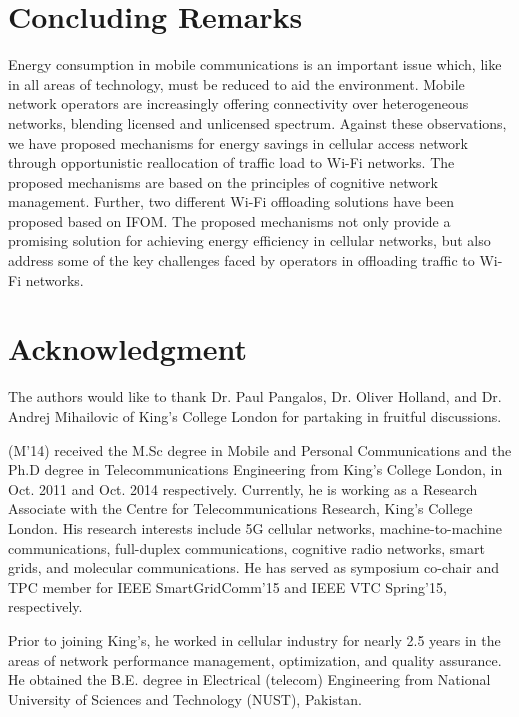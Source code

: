 \documentclass[journal]{IEEEtran}
\renewenvironment{IEEEbiography}[1]
  {\IEEEbiographynophoto{#1}}
  {\endIEEEbiographynophoto}
\begin{document}
\section{Concluding Remarks}
Energy consumption in mobile communications is an important issue which, like in all areas of technology, must be reduced to aid the environment. Mobile network operators are increasingly offering connectivity over heterogeneous networks, blending licensed and unlicensed spectrum. Against these observations, we have proposed mechanisms for energy savings in cellular access network through opportunistic reallocation of traffic load to Wi-Fi networks. The proposed mechanisms are based on the principles of cognitive network management. Further, two different Wi-Fi offloading solutions have been proposed based on IFOM. The proposed mechanisms not only provide a promising solution for achieving energy efficiency in cellular networks, but also address some of the key challenges faced by operators in offloading traffic to Wi-Fi networks. 















\section*{Acknowledgment}
The authors would like to thank Dr. Paul Pangalos, Dr. Oliver Holland, and Dr. Andrej Mihailovic of King's College London for partaking in fruitful discussions.














\begin{IEEEbiography}{Adnan Aijaz}
(M'14) received the M.Sc degree in Mobile and Personal Communications and the Ph.D degree in Telecommunications Engineering from King's College London, in Oct. 2011 and Oct. 2014 respectively. Currently, he is working as a Research Associate with the Centre for Telecommunications Research, King's College London. His research interests include 5G cellular networks, machine-to-machine communications, full-duplex communications, cognitive radio networks, smart grids, and molecular communications. He has served as  symposium co-chair and TPC member for IEEE SmartGridComm'15 and IEEE VTC Spring'15, respectively. 

Prior to joining King's, he worked in cellular industry for nearly 2.5 years in the areas of network performance management, optimization, and quality assurance. He obtained the B.E. degree in Electrical (telecom) Engineering from National University of Sciences and Technology (NUST), Pakistan.
\end{IEEEbiography}
\end{document}
